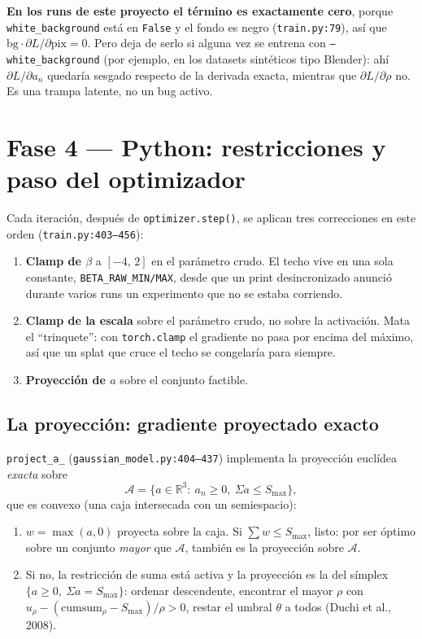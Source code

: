 \documentclass[12pt]{extarticle}
\newcommand{\ssum}{\Sigma a}
\newcommand{\code}[1]{\texttt{#1}}
\begin{document}
\textbf{En los runs de este proyecto el término es exactamente cero}, porque
\code{white\_background} está en \code{False} y el fondo es negro
(\code{train.py:79}), así que $\text{bg}\cdot\partial L/\partial\text{pix}=0$.
Pero deja de serlo si alguna vez se entrena con \code{--white\_background}
(por ejemplo, en los datasets sintéticos tipo Blender): ahí $\partial
L/\partial a_n$ quedaría sesgado respecto de la derivada exacta, mientras que
$\partial L/\partial\rho$ no. Es una trampa latente, no un bug activo.

\section{Fase 4 --- Python: restricciones y paso del optimizador}

Cada iteración, después de \code{optimizer.step()}, se aplican tres
correcciones en este orden (\code{train.py:403--456}):

\begin{enumerate}
\item \textbf{Clamp de $\beta$} a $[-4,\,2]$ en el parámetro crudo. El techo
      vive en una sola constante, \code{BETA\_RAW\_MIN/MAX}, desde que un print
      desincronizado anunció durante varios runs un experimento que no se
      estaba corriendo.
\item \textbf{Clamp de la escala} sobre el parámetro crudo, no sobre la
      activación. Mata el ``trinquete'': con \code{torch.clamp} el gradiente no
      pasa por encima del máximo, así que un splat que cruce el techo se
      congelaría para siempre.
\item \textbf{Proyección de $a$} sobre el conjunto factible.
\end{enumerate}

\subsection{La proyección: gradiente proyectado exacto}

\code{project\_a\_} (\code{gaussian\_model.py:404--437}) implementa la
proyección euclídea \emph{exacta} sobre
\[
\mathcal{A}=\{a\in\mathbb{R}^3:\ a_n\ge0,\ \ssum\le S_{\max}\},
\]
que es convexo (una caja intersecada con un semiespacio):

\begin{enumerate}
\item $w=\max(a,0)$ proyecta sobre la caja. Si $\sum w\le S_{\max}$, listo:
      por ser óptimo sobre un conjunto \emph{mayor} que $\mathcal{A}$, también
      es la proyección sobre $\mathcal{A}$.
\item Si no, la restricción de suma está activa y la proyección es la del
      símplex $\{a\ge0,\ \ssum=S_{\max}\}$: ordenar descendente, encontrar el
      mayor $\rho$ con $u_\rho-(\text{cumsum}_\rho-S_{\max})/\rho>0$, restar el
      umbral $\theta$ a todos (Duchi et al., 2008).
\end{enumerate}
\end{document}
